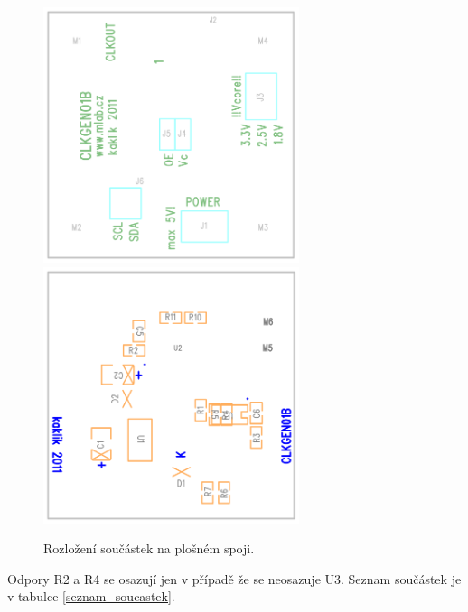 \documentclass[12pt,a4paper,oneside]{article}
\begin{document}
\begin{figure}[htbp]
\begin{center}
\includegraphics [width=75mm] {./img/O1.png} 
\includegraphics [width=75mm] {./img/O2.png} 
\end{center}
\caption{Rozložení součástek na plošném spoji.}
\label{Osazovaky}
\end{figure}

Odpory R2 a R4 se osazují jen v případě že se neosazuje U3. Seznam součástek je v tabulce \ref{seznam_soucastek}.
\end{document}
